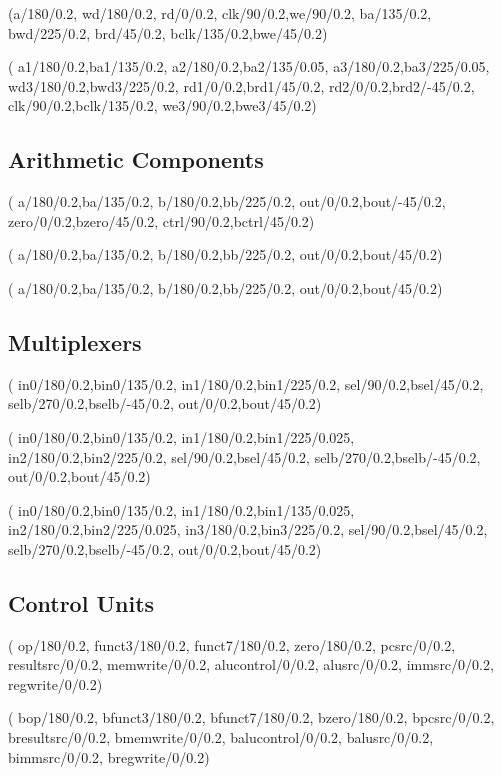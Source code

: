 \documentclass[.52pt,a4paper,titlepage]{article}
\begin{document}
(a/180/0.2, wd/180/0.2, rd/0/0.2, clk/90/0.2,we/90/0.2, ba/135/0.2, bwd/225/0.2, brd/45/0.2, bclk/135/0.2,bwe/45/0.2)

(
a1/180/0.2,ba1/135/0.2,
a2/180/0.2,ba2/135/0.05,
a3/180/0.2,ba3/225/0.05,
wd3/180/0.2,bwd3/225/0.2,
rd1/0/0.2,brd1/45/0.2,
rd2/0/0.2,brd2/-45/0.2,
clk/90/0.2,bclk/135/0.2,
we3/90/0.2,bwe3/45/0.2)

\subsection{Arithmetic Components}
(
a/180/0.2,ba/135/0.2,
b/180/0.2,bb/225/0.2,
out/0/0.2,bout/-45/0.2,
zero/0/0.2,bzero/45/0.2,
ctrl/90/0.2,bctrl/45/0.2)


(
a/180/0.2,ba/135/0.2,
b/180/0.2,bb/225/0.2,
out/0/0.2,bout/45/0.2)


(
a/180/0.2,ba/135/0.2,
b/180/0.2,bb/225/0.2,
out/0/0.2,bout/45/0.2)

\subsection{Multiplexers}
(
in0/180/0.2,bin0/135/0.2,
in1/180/0.2,bin1/225/0.2,
sel/90/0.2,bsel/45/0.2,
selb/270/0.2,bselb/-45/0.2,
out/0/0.2,bout/45/0.2)

(
in0/180/0.2,bin0/135/0.2,
in1/180/0.2,bin1/225/0.025,
in2/180/0.2,bin2/225/0.2,
sel/90/0.2,bsel/45/0.2,
selb/270/0.2,bselb/-45/0.2,
out/0/0.2,bout/45/0.2)

(
in0/180/0.2,bin0/135/0.2,
in1/180/0.2,bin1/135/0.025,
in2/180/0.2,bin2/225/0.025,
in3/180/0.2,bin3/225/0.2,
sel/90/0.2,bsel/45/0.2,
selb/270/0.2,bselb/-45/0.2,
out/0/0.2,bout/45/0.2)

\subsection{Control Units}
(
op/180/0.2,
funct3/180/0.2,
funct7/180/0.2,
zero/180/0.2,
pcsrc/0/0.2,
resultsrc/0/0.2,
memwrite/0/0.2,
alucontrol/0/0.2,
alusrc/0/0.2,
immsrc/0/0.2,
regwrite/0/0.2)

(
bop/180/0.2,
bfunct3/180/0.2,
bfunct7/180/0.2,
bzero/180/0.2,
bpcsrc/0/0.2,
bresultsrc/0/0.2,
bmemwrite/0/0.2,
balucontrol/0/0.2,
balusrc/0/0.2,
bimmsrc/0/0.2,
bregwrite/0/0.2)
\end{document}
